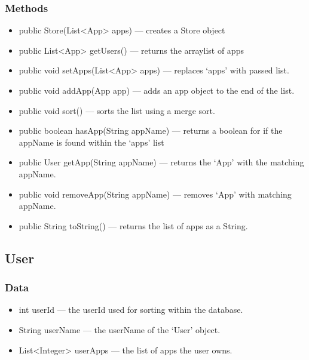 \documentclass{article}
\begin{document}
\subsubsection{Methods}
\begin{itemize}
    \item{public Store(List<App> apps)}
        --- creates a Store object
    \item{public List<App> getUsers()}
        --- returns the arraylist of apps
    \item{public void setApps(List<App> apps)}
        --- replaces `apps' with passed list.
    \item{public void addApp(App app)}
        --- adds an app object to the end of the list.
    \item{public void sort()}
        --- sorts the list using a merge sort.
    \item{public boolean hasApp(String appName)}
        --- returns a boolean for if the appName is found within the `apps' list
    \item{public User getApp(String appName)}
        --- returns the `App' with the matching appName.
    \item{public void removeApp(String appName)}
        --- removes `App' with matching appName.
    \item{public String toString()}
        --- returns the list of apps as a String.
\end{itemize}
\subsection{User}
\subsubsection{Data}
\begin{itemize}
    \item{int userId}
        --- the userId used for sorting within the database.
    \item{String userName}
        --- the userName of the `User' object.
    \item{List<Integer> userApps}
        --- the list of apps the user owns.
\end{itemize}
\end{document}
